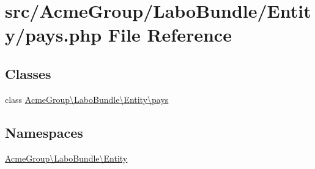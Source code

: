 \hypertarget{pays_8php}{\section{src/\+Acme\+Group/\+Labo\+Bundle/\+Entity/pays.php File Reference}
\label{pays_8php}
}
\subsection*{Classes}
\begin{DoxyCompactItemize}
\item 
class \hyperlink{class_acme_group_1_1_labo_bundle_1_1_entity_1_1pays}{Acme\+Group\textbackslash{}\+Labo\+Bundle\textbackslash{}\+Entity\textbackslash{}pays}
\end{DoxyCompactItemize}
\subsection*{Namespaces}
\begin{DoxyCompactItemize}
\item 
 \hyperlink{namespace_acme_group_1_1_labo_bundle_1_1_entity}{Acme\+Group\textbackslash{}\+Labo\+Bundle\textbackslash{}\+Entity}
\end{DoxyCompactItemize}
